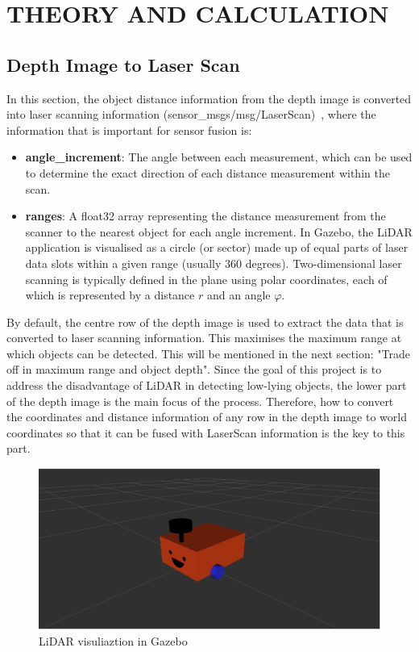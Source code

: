 \section{THEORY AND CALCULATION}
\label{sec:theory_and_calculation}
\subsection{Depth Image to Laser Scan}
In this section, the object distance information from the depth image is converted into laser scanning information (sensor\_msgs/msg/LaserScan)~\cite{laserscan}, 
where the information that is important for sensor fusion is:
\begin{itemize}[leftmargin=*]
    \item \textbf{angle\_increment}: The angle between each measurement, 
    which can be used to determine the exact direction of each distance measurement within the scan. 
    \item \textbf{ranges}: A float32 array representing the distance measurement from the scanner to the nearest object for each angle increment. 
    In Gazebo, the LiDAR application is visualised as a circle (or sector) made up of equal parts of laser data slots within a given range (usually $360$ degrees). 
    Two-dimensional laser scanning is typically defined in the plane using polar coordinates, each of which is represented by a distance $r$ and an angle $\varphi$.
\end{itemize}
By default, the centre row of the depth image is used to extract the data that is converted to laser scanning information. 
This maximises the maximum range at which objects can be detected. 
This will be mentioned in the next section: "Trade off in maximum range and object depth". 
Since the goal of this project is to address the disadvantage of LiDAR in detecting low-lying objects, 
the lower part of the depth image is the main focus of the process. 
Therefore, how to convert the coordinates and distance information of any row in the depth image to world coordinates 
so that it can be fused with LaserScan information is the key to this part.

\begin{figure}[H]
    \centering
    \includegraphics[width=0.8\linewidth]{figs/robot.png}
    \caption{LiDAR visuliaztion in Gazebo}
\end{figure}

